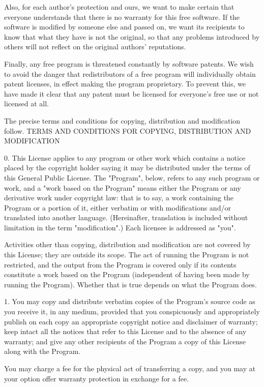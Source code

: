 \begin{small}
Also, for each author's protection and ours, we want to make certain that
everyone understands that there is no warranty for this free software. If the
software is modified by someone else and passed on, we want its recipients to
know that what they have is not the original, so that any problems introduced
by others will not reflect on the original authors' reputations.

Finally, any free program is threatened constantly by software patents. We
wish to avoid the danger that redistributors of a free program will
individually obtain patent licenses, in effect making the program proprietary.
To prevent this, we have made it clear that any patent must be licensed for
everyone's free use or not licensed at all.

The precise terms and conditions for copying, distribution and modification
follow.
TERMS AND CONDITIONS FOR COPYING, DISTRIBUTION AND MODIFICATION

0. This License applies to any program or other work which contains a notice
placed by the copyright holder saying it may be distributed under the terms of
this General Public License. The "Program", below, refers to any such program
or work, and a "work based on the Program" means either the Program or any
derivative work under copyright law: that is to say, a work containing the
Program or a portion of it, either verbatim or with modifications and/or
translated into another language. (Hereinafter, translation is included
without limitation in the term "modification".) Each licensee is addressed as
"you".

Activities other than copying, distribution and modification are not covered
by this License; they are outside its scope. The act of running the Program is
not restricted, and the output from the Program is covered only if its
contents constitute a work based on the Program (independent of having been
made by running the Program). Whether that is true depends on what the Program
does.

1. You may copy and distribute verbatim copies of the Program's source code as
you receive it, in any medium, provided that you conspicuously and
appropriately publish on each copy an appropriate copyright notice and
disclaimer of warranty; keep intact all the notices that refer to this License
and to the absence of any warranty; and give any other recipients of the
Program a copy of this License along with the Program.

You may charge a fee for the physical act of transferring a copy, and you may
at your option offer warranty protection in exchange for a fee.


\end{small}
